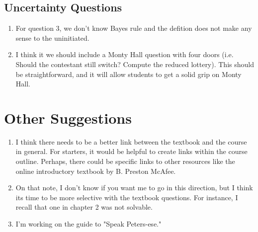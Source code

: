 \documentclass[12pt, fleqn]{article}
\begin{document}
\subsection{Uncertainty Questions}
\begin{enumerate}
	\item For question 3, we don't know Bayes rule and the defition does not make any sense to the uninitiated.  
	\item I think it we should include a Monty Hall question with four doors (i.e. Should the contestant still switch? Compute the reduced lottery).  This should be straightforward, and it will allow students to get a solid grip on Monty Hall.  
\end{enumerate}

\section{Other Suggestions}

\begin{enumerate}
	    \item I think there needs to be a better link between the textbook and the course in general.  For starters, it would be helpful to create links within the course outline.  Perhaps, there could be specific links to other resources like the online introductory textbook by B. Preston McAfee. 
	    \item On that note, I don't know if you want me to go in this direction, but I think its time to be more selective with the textbook questions.  For instance, I recall that one in chapter 2 was not solvable.  
	    \item I'm working on the guide to "Speak Peters-ese."
\end{enumerate}
\end{document}
